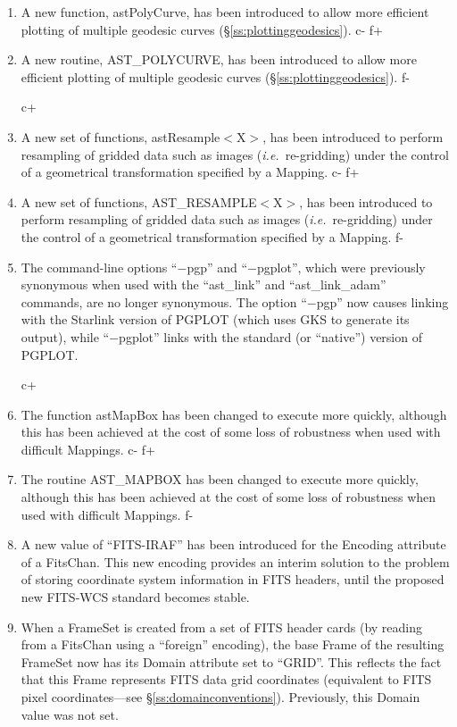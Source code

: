 \documentclass[twoside,11pt]{starlink}
\providecommand{\secref}[1]{\S\ref{#1}}
\begin{document}
\begin{enumerate}
c+
\item A new function, astPolyCurve, has been introduced to allow more
efficient plotting of multiple geodesic curves
(\secref{ss:plottinggeodesics}).
c-
f+
\item A new routine, AST\_POLYCURVE, has been introduced to allow more
efficient plotting of multiple geodesic curves
(\secref{ss:plottinggeodesics}).
f-

c+
\item A new set of functions, astResample$<$X$>$, has been introduced
to perform resampling of gridded data such as images
(\emph{i.e.}\ re-gridding) under the control of a geometrical
transformation specified by a Mapping.
c-
f+
\item A new set of functions, AST\_RESAMPLE$<$X$>$, has been
introduced to perform resampling of gridded data such as images
(\emph{i.e.}\ re-gridding) under the control of a geometrical
transformation specified by a Mapping.
f-

\item The command-line options ``$-$pgp'' and ``$-$pgplot'', which
were previously synonymous when used with the ``ast\_link'' and
``ast\_link\_adam'' commands, are no longer synonymous. The option
``$-$pgp'' now causes linking with the Starlink version of PGPLOT
(which uses GKS to generate its output), while ``$-$pgplot'' links
with the standard (or ``native'') version of PGPLOT.

c+
\item The function astMapBox has been changed to execute more quickly,
although this has been achieved at the cost of some loss of robustness
when used with difficult Mappings.
c-
f+
\item The routine AST\_MAPBOX has been changed to execute more
quickly, although this has been achieved at the cost of some loss of
robustness when used with difficult Mappings.
f-

\item A new value of ``FITS-IRAF'' has been introduced for the
Encoding attribute of a FitsChan. This new encoding provides an
interim solution to the problem of storing coordinate system
information in FITS headers, until the proposed new FITS-WCS standard
becomes stable.

\item When a FrameSet is created from a set of FITS header cards (by
reading from a FitsChan using a ``foreign'' encoding), the base Frame
of the resulting FrameSet now has its Domain attribute set to
``GRID''. This reflects the fact that this Frame represents FITS data
grid coordinates (equivalent to FITS pixel coordinates---see
\secref{ss:domainconventions}). Previously, this Domain value was not
set.


\end{enumerate}
\end{document}
